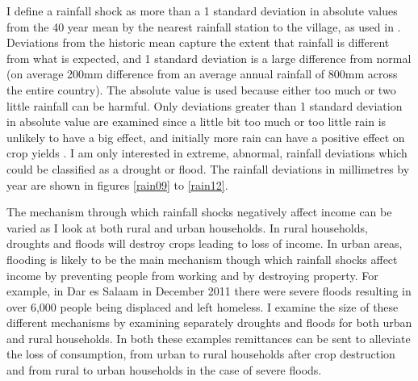 I define a rainfall shock as more than a 1 standard deviation in absolute values from the 40 year mean by the nearest rainfall station to the village, as used in \cite{jensen2000}.  Deviations from the historic mean capture the extent that rainfall is different from what is expected, and 1 standard deviation is a large difference from normal (on average 200mm difference from an average annual rainfall of 800mm across the entire country). The absolute value is used because either too much or two little rainfall can be harmful. Only deviations greater than 1 standard deviation in absolute value are examined since a little bit too much or too little rain is unlikely to have a big effect, and initially more rain can have a positive effect on crop yields \cite{paxson1992using}. I am only interested in extreme, abnormal, rainfall deviations which could be classified as a drought or flood. The rainfall deviations in millimetres by year are shown in figures \ref{rain09} to \ref{rain12}.    

The mechanism through which rainfall shocks negatively affect income can be varied as I look at both rural and urban households. In rural households, droughts and floods will destroy crops leading to loss of income. In urban areas, flooding is likely to be the main mechanism though which rainfall shocks affect income by preventing people from working and by destroying property. For example, in Dar es Salaam in December 2011 there were severe floods resulting in over 6,000 people being displaced and left homeless. I examine the size of these different mechanisms by examining separately droughts and floods for both urban and rural households. In both these examples remittances can be sent to alleviate the loss of consumption, from urban to rural households after crop destruction and from rural to urban households in the case of severe floods. 

